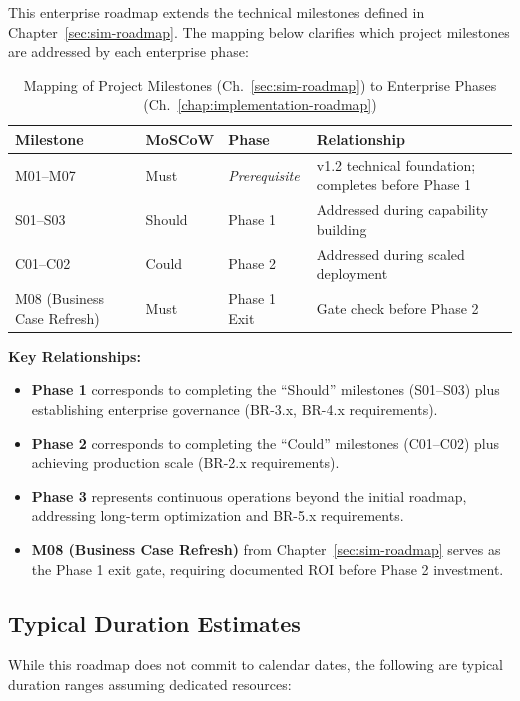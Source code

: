 \documentclass[12pt,a4paper,twoside]{report}
\begin{document}
This enterprise roadmap extends the technical milestones defined in
Chapter~\ref{sec:sim-roadmap}. The mapping below clarifies which project
milestones are addressed by each enterprise phase:

\begin{table}[htbp]
\centering
\caption{Mapping of Project Milestones (Ch.~\ref{sec:sim-roadmap}) to Enterprise Phases (Ch.~\ref{chap:implementation-roadmap})}
\label{tab:milestone-to-phase}
\footnotesize
\begin{tabularx}{\textwidth}{@{}l l l X@{}}
\toprule
\textbf{Milestone} & \textbf{MoSCoW} & \textbf{Phase} & \textbf{Relationship} \\
\midrule
M01--M07 & Must & \textit{Prerequisite} & v1.2 technical foundation; completes before Phase 1 \\
S01--S03 & Should & Phase 1 & Addressed during capability building \\
C01--C02 & Could & Phase 2 & Addressed during scaled deployment \\
M08 (Business Case Refresh) & Must & Phase 1 Exit & Gate check before Phase 2 \\
\bottomrule
\end{tabularx}
\end{table}

\noindent
\textbf{Key Relationships:}
\begin{itemize}
\item \textbf{Phase 1} corresponds to completing the ``Should'' milestones (S01--S03)
plus establishing enterprise governance (BR-3.x, BR-4.x requirements).
\item \textbf{Phase 2} corresponds to completing the ``Could'' milestones (C01--C02)
plus achieving production scale (BR-2.x requirements).
\item \textbf{Phase 3} represents continuous operations beyond the initial roadmap,
addressing long-term optimization and BR-5.x requirements.
\item \textbf{M08 (Business Case Refresh)} from Chapter~\ref{sec:sim-roadmap} serves
as the Phase 1 exit gate, requiring documented ROI before Phase 2 investment.
\end{itemize}

\subsection*{Typical Duration Estimates}

While this roadmap does not commit to calendar dates, the following are typical
duration ranges assuming dedicated resources:
\end{document}
